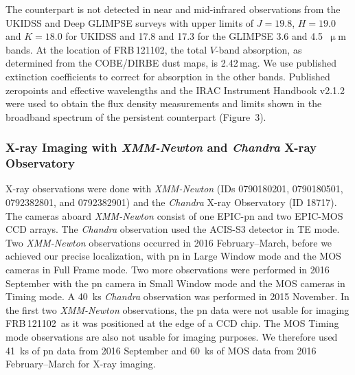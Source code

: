 \documentclass{nature_frb}
\newcommand{\frb}{FRB\,121102}
\begin{document}
The counterpart is not detected in near and mid-infrared observations from the UKIDSS\cite{lwa+07} and Deep GLIMPSE\cite{bcb+03,cbm+09} surveys with upper limits of $J=19.8$, $H=19.0$ and $K=18.0$ for UKIDSS and 17.8 and 17.3 for the GLIMPSE 3.6 and 4.5~$\upmu$m bands. At the location of \frb, the total $V$-band absorption, as determined from the COBE/DIRBE dust maps\cite{sfd98}, is 2.42\,mag. We use published extinction coefficients\cite{sf11} to correct for absorption in the other bands. Published zeropoints and effective wavelengths\cite{bcp98,fig+96,hwlh06} and the IRAC Instrument Handbook v2.1.2 were used to obtain the flux density measurements and limits shown in the broadband spectrum of the persistent counterpart (Figure~3).


\subsubsection*{X-ray Imaging with {\it XMM-Newton} and {\it Chandra} X-ray Observatory}
X-ray observations were done with {\it XMM-Newton} (IDs 0790180201, 0790180501, 0792382801, and 0792382901) and the {\it Chandra} X-ray Observatory (ID 18717). The cameras aboard {\it XMM-Newton} consist of one EPIC-pn\cite{sbd+01} and two EPIC-MOS\cite{taa+01} CCD arrays. The {\it Chandra} observation used the ACIS-S3 detector in TE mode. Two {\it XMM-Newton} observations occurred in 2016 February--March, before we achieved our precise localization, with pn in Large Window mode and the MOS cameras in Full Frame mode. Two more observations were performed in 2016 September with the pn camera in Small Window mode and the MOS cameras in Timing mode. A 40~ks {\it Chandra} observation was performed in 2015 November. In the first two {\it XMM-Newton} observations, the pn data were not usable for imaging \frb\ as it was positioned at the edge of a CCD chip. The MOS Timing mode observations are also not usable for imaging purposes. We therefore used 41~ks of pn data from 2016 September and 60~ks of MOS data from 2016 February--March for X-ray imaging.
\end{document}
